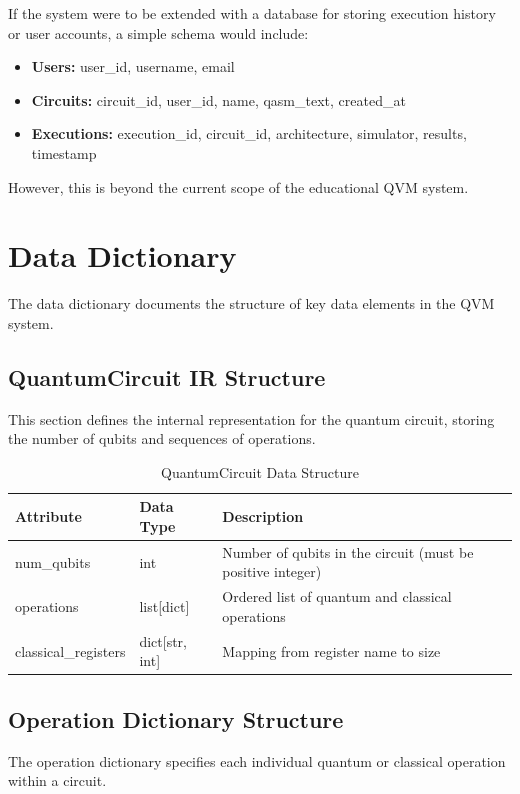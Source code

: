 If the system were to be extended with a database for storing execution history or user accounts, a simple schema would include:
\begin{itemize}
\item \textbf{Users:} user\_id, username, email
\item \textbf{Circuits:} circuit\_id, user\_id, name, qasm\_text, created\_at
\item \textbf{Executions:} execution\_id, circuit\_id, architecture, simulator, results, timestamp
\end{itemize}

However, this is beyond the current scope of the educational QVM system.

\section{Data Dictionary}
The data dictionary documents the structure of key data elements in the QVM system.

\subsection{QuantumCircuit IR Structure}
This section defines the internal representation for the quantum circuit, storing the number of qubits and sequences of operations.

\begin{table}[H]
\centering
\caption{QuantumCircuit Data Structure}
\begin{tabular}{|p{3cm}|p{2.5cm}|p{7cm}|}
\hline
\textbf{Attribute} & \textbf{Data Type} & \textbf{Description} \\
\hline
num\_qubits & int & Number of qubits in the circuit (must be positive integer) \\
\hline
operations & list[dict] & Ordered list of quantum and classical operations \\
\hline
classical\_registers & dict[str, int] & Mapping from register name to size \\
\hline
\end{tabular}
\end{table}

\subsection{Operation Dictionary Structure}
The operation dictionary specifies each individual quantum or classical operation within a circuit.

